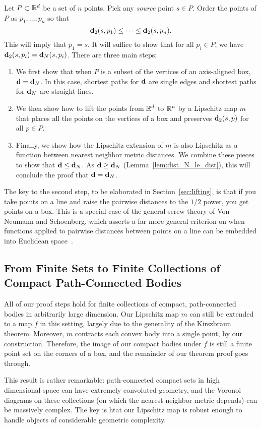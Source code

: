 \label{sec:the_proof}

  Let $P\subset \mathbb{R}^d$ be a set of $n$ points.
  Pick any \emph{source} point $s\in P$.
  Order the points of $P$ as $p_1,\ldots ,p_n$ so that
  \[
    \mathbf{d}_2(s,p_1) \le \cdots \le \mathbf{d}_2(s, p_n).
  \]
  This will imply that $p_1 = s$.
  It will suffice to show that for all $p_i\in P$, we have $\mathbf{d}_2(s,p_i) = \mathbf{d}_N(s,p_i)$.
  There are three main steps:
  \begin{enumerate}
    \item We first show that when $P$ is a subset of the vertices of an axis-aligned box, $\mathbf{d} = \mathbf{d}_N$.  In this case, shortest paths for $\mathbf{d}$ are single edges and shortest paths for $\mathbf{d}_N$ are straight lines.
    \item We then show how to lift the points from $\mathbb{R}^d$ to $\mathbb{R}^n$ by a Lipschitz map $m$ that places all the points on the vertices of a box and preserves $\mathbf{d}_2(s,p)$ for all $p\in P$.
    \item Finally, we show how the Lipschitz extension of $m$ is also Lipschitz as a function between nearest neighbor metric distances.  We combine these pieces to show that $\mathbf{d} \le \mathbf{d}_N$.  As $\mathbf{d} \ge \mathbf{d}_N$ (Lemma~\ref{lem:dist_N_le_dist}), this will conclude the proof that $\mathbf{d} = \mathbf{d}_N$.
  \end{enumerate}
The key to the second step, to be elaborated in Section~\ref{sec:lifting},
is that if you take points on a line and raise the pairwise distances to
the $1/2$ power, you get points on a box. This is a special case of the
general screw theory of Von Neumann and Schoenberg, which asserts a far
more general criterion on when functions applied to pairwise distances
between points on a line can be embedded into Euclidean space~\cite{}.
  
  
  
\subsection{From Finite Sets to Finite Collections of Compact Path-Connected Bodies}
All of our proof steps hold for finite collections of compact,
path-connected bodies in arbitrarily large dimension. Our Lipschitz map $m$ can
still be extended to a map $f$ in this setting, largely due to the
generality of the Kirszbraun theorem. Moreover, $m$ contracts each convex
body into a single point, by our construction. Therefore, the image of our
compact bodies under $f$ is still a finite point set on the corners of a
box, and the remainder of our theorem proof goes through.

This result is rather remarkable: path-connected compact sets in high
dimensional space can have extremely convoluted geometry, and the Voronoi diagrams
on these collections (on which the nearest neighbor metric depends) can be
massively complex.  The key is htat our Lipschitz map is robust enough to
handle objects of considerable geometric complexity.
  
  

